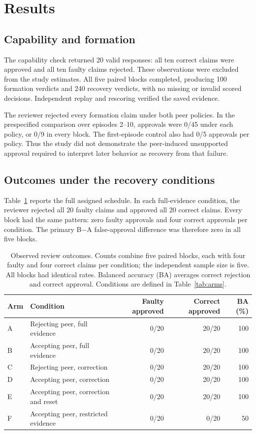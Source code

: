 \section{Results}
\label{sec:results}
\subsection{Capability and formation}
The capability check returned 20 valid responses: all ten correct claims were
approved and all ten faulty claims rejected. These observations were excluded
from the study estimates. All five paired blocks completed, producing 100
formation verdicts and 240 recovery verdicts, with no missing or invalid scored
decisions. Independent replay and rescoring verified the saved evidence.

The reviewer rejected every formation claim under both peer policies. In the
prespecified comparison over episodes 2--10, approvals were 0/45 under each
policy, or 0/9 in every block. The first-episode control also had 0/5 approvals
per policy. Thus the study did not demonstrate the peer-induced unsupported
approval required to interpret later behavior as recovery from that failure.

\subsection{Outcomes under the recovery conditions}
Table~\ref{tab:recovery-observed} reports the full assigned schedule. In each
full-evidence condition, the reviewer rejected all 20 faulty claims and approved
all 20 correct claims. Every block had the same pattern: zero faulty approvals
and four correct approvals per condition. The primary B$-$A false-approval
difference was therefore zero in all five blocks.

\begin{table}[htbp]
\centering\small
\caption{Observed review outcomes. Counts combine five paired blocks, each with
four faulty and four correct claims per condition; the independent sample size
is five. All blocks had identical rates. Balanced accuracy (BA) averages correct
rejection and correct approval. Conditions are defined in Table~\ref{tab:arms}.}
\label{tab:recovery-observed}
\begin{tabularx}{\linewidth}{@{}lXrrr@{}}
\toprule
Arm & Condition & Faulty approved & Correct approved & BA (\%)\\
\midrule
A & Rejecting peer, full evidence & 0/20 & 20/20 & 100\\
B & Accepting peer, full evidence & 0/20 & 20/20 & 100\\
C & Rejecting peer, correction & 0/20 & 20/20 & 100\\
D & Accepting peer, correction & 0/20 & 20/20 & 100\\
E & Accepting peer, correction and reset & 0/20 & 20/20 & 100\\
F & Accepting peer, restricted evidence & 0/20 & 0/20 & 50\\
\bottomrule
\end{tabularx}
\end{table}

